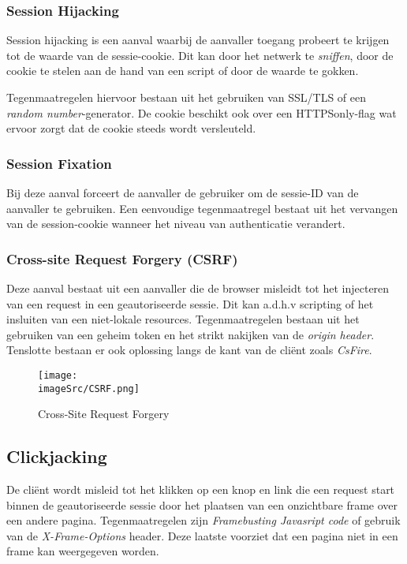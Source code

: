 \documentclass[../main.tex]{subfiles}
\begin{document}
\subsubsection{Session Hijacking}
Session hijacking is een aanval waarbij de aanvaller toegang probeert te krijgen tot de waarde van de sessie-cookie. Dit kan door het netwerk te \textit{sniffen}, door de cookie te stelen aan de hand van een script of door de waarde te gokken. 

Tegenmaatregelen hiervoor bestaan uit het gebruiken van SSL/TLS of een \textit{random number}-generator. De cookie beschikt ook over een HTTPSonly-flag wat ervoor zorgt dat de cookie steeds wordt versleuteld. 

\subsubsection{Session Fixation}
Bij deze aanval forceert de aanvaller de gebruiker om de sessie-ID van de aanvaller te gebruiken. Een eenvoudige tegenmaatregel bestaat uit het vervangen van de session-cookie wanneer het niveau van authenticatie verandert.

\subsubsection{Cross-site Request Forgery (CSRF)}
Deze aanval bestaat uit een aanvaller die de browser misleidt tot het injecteren van een request in een geautoriseerde sessie. Dit kan a.d.h.v scripting of het insluiten van een niet-lokale resources. Tegenmaatregelen bestaan uit het gebruiken van een geheim token en het strikt nakijken van de \textit{origin header}. Tenslotte bestaan er ook oplossing langs de kant van de cli\"ent zoals \textit{CsFire}.

\begin{figure}[h!]
    \centering
    \texttt{[image: \\imageSrc/CSRF.png]}
    \caption{Cross-Site Request Forgery}
    \label{fig:awesome_image}
\end{figure}

\subsection{Clickjacking}
De cli\"ent wordt misleid tot het klikken op een knop en link die een request start binnen de geautoriseerde sessie door het plaatsen van een onzichtbare frame over een andere pagina. Tegenmaatregelen zijn \textit{Framebusting Javasript code} of gebruik van de \textit{X-Frame-Options} header. Deze laatste voorziet dat een pagina niet in een frame kan weergegeven worden.
\end{document}
